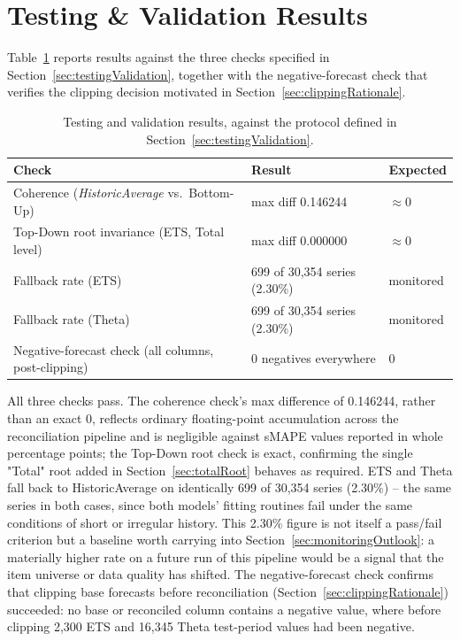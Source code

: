 \section{Testing \& Validation Results}
\label{sec:testingValidationResults}

Table~\ref{table:sanityChecks} reports results against the three checks specified in Section~\ref{sec:testingValidation}, together with the negative-forecast check that verifies the clipping decision motivated in Section~\ref{sec:clippingRationale}.

\begin{table}[htbp]
	\centering
	\small
	\caption{Testing and validation results, against the protocol defined in Section~\ref{sec:testingValidation}.}
	\label{table:sanityChecks}
	\begin{tabular}{@{} p{5.2cm} p{4.6cm} p{3.0cm} @{}}
		\toprule
		\textbf{Check} & \textbf{Result} & \textbf{Expected} \\
		\midrule
		Coherence (\textit{HistoricAverage} vs.\ Bottom-Up) & max diff 0.146244 & $\approx 0$ \\
		\addlinespace
		Top-Down root invariance (ETS, Total level) & max diff 0.000000 & $\approx 0$ \\
		\addlinespace
		Fallback rate (ETS)   & 699 of 30,354 series (2.30\%) & monitored \\
		Fallback rate (Theta) & 699 of 30,354 series (2.30\%) & monitored \\
		\addlinespace
		Negative-forecast check (all columns, post-clipping) & 0 negatives everywhere & 0 \\
		\bottomrule
	\end{tabular}
\end{table}

All three checks pass. The coherence check's max difference of 0.146244, rather than an exact 0, reflects ordinary floating-point accumulation across the reconciliation pipeline and is negligible against sMAPE values reported in whole percentage points; the Top-Down root check is exact, confirming the single "Total" root added in Section~\ref{sec:totalRoot} behaves as required. ETS and Theta fall back to HistoricAverage on identically 699 of 30,354 series (2.30\%) -- the same series in both cases, since both models' fitting routines fail under the same conditions of short or irregular history. This 2.30\% figure is not itself a pass/fail criterion but a baseline worth carrying into Section~\ref{sec:monitoringOutlook}: a materially higher rate on a future run of this pipeline would be a signal that the item universe or data quality has shifted. The negative-forecast check confirms that clipping base forecasts before reconciliation (Section~\ref{sec:clippingRationale}) succeeded: no base or reconciled column contains a negative value, where before clipping 2,300 ETS and 16,345 Theta test-period values had been negative.

